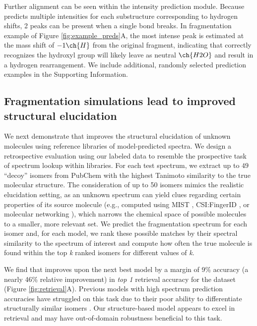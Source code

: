 \documentclass[journal=jcim,manuscript=article]{achemso}
\begin{document}
Further alignment can be seen within the intensity prediction module. Because \ourModel predicts multiple intensities for each substructure corresponding to hydrogen shifts, 2 peaks can be present when a single bond breaks. In fragmentation example of  Figure \ref{fig:example_preds}A, the most intense peak is estimated at the mass shift of $-1\ch{H}$ from the original fragment, indicating that \ourModel correctly recognizes the hydroxyl group will likely leave as neutral $\ch{H2O}$ and result in a hydrogen rearrangement. We include additional, randomly selected prediction examples in the Supporting Information. %



\subsection{Fragmentation simulations lead to improved structural elucidation}
\label{sec:spec_annotation}


We next demonstrate that \ourModel improves the structural elucidation of unknown molecules using reference libraries of model-predicted spectra. %
We design a retrospective evaluation using our labeled data to resemble the prospective task of spectrum lookup within libraries. For each test spectrum, we extract up to $49$ ``decoy''  isomers  from PubChem \cite{kim_pubchem_2016} with the highest Tanimoto similarity to the true molecular structure. 
The consideration of up to 50 isomers mimics the realistic elucidation setting, as an unknown spectrum can yield clues regarding certain properties of its source molecule (e.g., computed using MIST \cite{Goldman2023annotating}, CSI:FingerID \cite{duhrkop_searching_2015}, or molecular networking \cite{nothias_feature-based_2020}), which narrows the chemical space of possible molecules to a smaller, more relevant set. %
We predict the fragmentation spectrum for each isomer and, for each model, we rank these possible matches by their spectral similarity to the spectrum of interest and compute how often the true molecule is found within the top \emph{k} ranked isomers for different values of \emph{k}. 



We find that \ourModel improves upon the next best model by a margin of 9\% accuracy (a nearly 46\% relative improvement) in \emph{top 1} retrieval accuracy for the \gnpsData dataset (Figure \ref{fig:retrieval}A). Previous models with high spectrum prediction accuracies have struggled on this task due to their poor ability to differentiate structurally similar isomers  \cite{goldman_prefix-tree_2023}. Our  structure-based model appears to excel in retrieval and may have out-of-domain robustness beneficial to this task.
\end{document}
